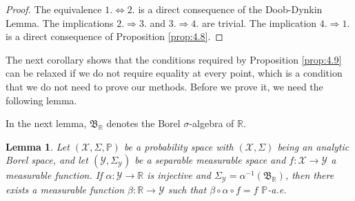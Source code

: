 \documentclass[12pt]{article}
\newtheorem{lemma}{Lemma}[section]
\begin{document}
\begin{proof}
 The equivalence $1.\Leftrightarrow 2.$ is a direct consequence of the Doob-Dynkin Lemma. The implications $2.\Rightarrow 3.$ and $3.\Rightarrow 4.$ are trivial. The implication $4.\Rightarrow 1.$ is a direct consequence of Proposition \ref{prop:4.8}.
\end{proof}

The next corollary shows that the conditions required by Proposition \ref{prop:4.9} can be relaxed if we do not require equality at every point, which is a condition that we do not need to prove our methods. Before we prove it, we need the following lemma.

In the next lemma, $\mathfrak{B}_\mathbb{R}$ denotes the Borel $\sigma$-algebra of $\mathbb{R}$.

\begin{lemma}
\label{lemma_doob}
Let $(\mathcal{X},\Sigma,\mathbb{P})$ be a probability space with $(\mathcal{X},\Sigma)$ being an analytic Borel space, and let $(\mathcal{Y},\Sigma_\mathcal{Y})$ be a separable measurable space and $f:\mathcal{X}\to\mathcal{Y}$ a measurable function. If $\alpha:\mathcal{Y}\to\mathbb{R}$ is injective and $\Sigma_\mathcal{Y} =\alpha^{-1}(\mathfrak{B}_\mathbb{R})$, then there exists a measurable function $\beta:\mathbb{R}\to\mathcal{Y}$ such that $\beta\circ \alpha \circ f=f$ $\mathbb{P}$-a.e.
\end{lemma}
\end{document}
